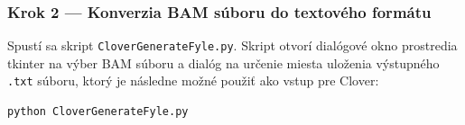 \subsubsection*{Krok 2 — Konverzia BAM súboru do textového formátu}
Spustí sa skript \texttt{CloverGenerateFyle.py}. Skript otvorí dialógové okno prostredia tkinter na výber BAM súboru a dialóg na určenie miesta uloženia výstupného \texttt{.txt} súboru, ktorý je následne možné použiť ako vstup pre Clover:
\begin{verbatim}
python CloverGenerateFyle.py
\end{verbatim}
